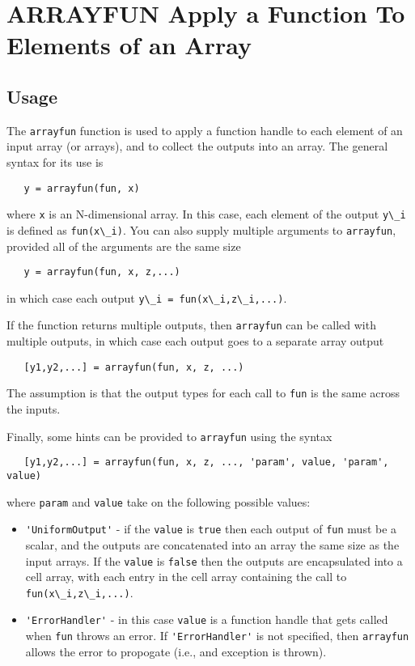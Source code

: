 \section{ARRAYFUN Apply a Function To Elements of an Array}

\subsection{Usage}

The \verb|arrayfun| function is used to apply a function handle
to each element of an input array (or arrays), and to collect
the outputs into an array.  The general syntax for its use is
\begin{verbatim}
   y = arrayfun(fun, x)
\end{verbatim}
where \verb|x| is an N-dimensional array.  In this case, each 
element of the output \verb|y\_i| is defined as \verb|fun(x\_i)|.  You can
also supply multiple arguments to \verb|arrayfun|, provided all of the
arguments are the same size
\begin{verbatim}
   y = arrayfun(fun, x, z,...)
\end{verbatim}
in which case each output \verb|y\_i = fun(x\_i,z\_i,...)|.

If the function returns multiple outputs, then \verb|arrayfun| can be
called with multiple outputs, in which case each output goes to
a separate array output
\begin{verbatim}
   [y1,y2,...] = arrayfun(fun, x, z, ...)
\end{verbatim}
The assumption is that the output types for each call to \verb|fun| is
the same across the inputs.

Finally, some hints can be provided to \verb|arrayfun| using the syntax
\begin{verbatim}
   [y1,y2,...] = arrayfun(fun, x, z, ..., 'param', value, 'param', value)
\end{verbatim}
where \verb|param| and \verb|value| take on the following possible values:
\begin{itemize}
\item  \verb|'UniformOutput'| - if the \verb|value| is \verb|true| then each output of \verb|fun|
   must be a scalar, and the outputs are concatenated into an array the same size
   as the input arrays.  If the \verb|value| is \verb|false| then the outputs are encapsulated
   into a cell array, with each entry in the cell array containing the call to 
   \verb|fun(x\_i,z\_i,...)|.

\item  \verb|'ErrorHandler'| - in this case \verb|value| is a function handle that gets called
  when \verb|fun| throws an error.  If \verb|'ErrorHandler'| is not specified, then \verb|arrayfun|
  allows the error to propogate (i.e., and exception is thrown).

\end{itemize}

